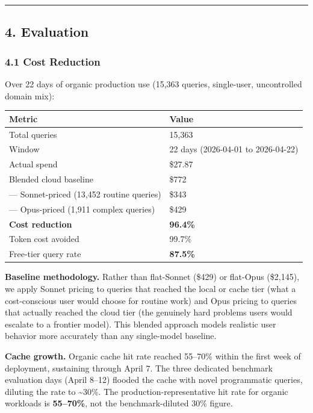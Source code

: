 \begin{center}\rule{0.5\linewidth}{0.5pt}\end{center}

\subsection{4. Evaluation}\label{evaluation}

\subsubsection{4.1 Cost Reduction}\label{cost-reduction}

Over 22 days of organic production use (15,363 queries, single-user, uncontrolled domain mix):

{\def\LTcaptype{none} %
\begin{longtable}[]{@{}ll@{}}
\toprule\noalign{}
Metric & Value \\
\midrule\noalign{}
\endhead
\bottomrule\noalign{}
\endlastfoot
Total queries & 15,363 \\
Window & 22 days (2026-04-01 to 2026-04-22) \\
Actual spend & \$27.87 \\
Blended cloud baseline & \$772 \\
--- Sonnet-priced (13,452 routine queries) & \$343 \\
--- Opus-priced (1,911 complex queries) & \$429 \\
\textbf{Cost reduction} & \textbf{96.4\%} \\
Token cost avoided & 99.7\% \\
Free-tier query rate & \textbf{87.5\%} \\
\end{longtable}
}

\textbf{Baseline methodology.} Rather than flat-Sonnet (\$429) or flat-Opus (\$2,145), we apply Sonnet pricing to queries that reached the local or cache tier (what a cost-conscious user would choose for routine work) and Opus pricing to queries that actually reached the cloud tier (the genuinely hard problems users would escalate to a frontier model). This blended approach models realistic user behavior more accurately than any single-model baseline.

\textbf{Cache growth.} Organic cache hit rate reached 55--70\% within the first week of deployment, sustaining through April 7. The three dedicated benchmark evaluation days (April 8--12) flooded the cache with novel programmatic queries, diluting the rate to \textasciitilde30\%. The production-representative hit rate for organic workloads is \textbf{55--70\%}, not the benchmark-diluted 30\% figure.

